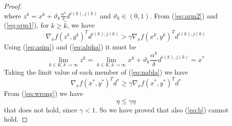 \begin{proof}
\begin{equation}
\end{equation}
where $z^k = x^k + \vartheta_k \frac{\alpha^k}{\delta} d^{i(k),j(k)}$ and $\vartheta_k \in (0,1)$. From (\ref{eq:arm2}) and (\ref{eq:arm1}), for $k \geq \hat{k}$, we have
\begin{equation}\label{eq:nabla}
\nabla_x f(z^k, y^k)^T d^{i(k),j(k)}  > \gamma \nabla_x f(x^k , y^k)^T d^{i(k),j(k)}
\end{equation}
Using (\ref{eq:asim}) and (\ref{eq:alpha}) it must be
\begin{equation}
\lim_{k \in K, k \rightarrow \infty} z^k = \lim_{k \in K, k \rightarrow \infty} x^k + \vartheta_k \frac{\alpha^k}{\delta} d^{i(k),j(k)} = x^*
\end{equation}
Taking the limit value of each member of (\ref{eq:nabla}) we have
\begin{equation}
\nabla_x f(x^*, y^*)^T d^* \geq \gamma \nabla_x f(x^*, y^*)^T d^*
\end{equation}
From (\ref{eq:wrong}) we have
\begin{equation}
\eta \leq \gamma \eta
\end{equation}
that does not hold, since $\gamma < 1$. So we have proved that also (\ref{eq:b}) cannot hold.
\end{proof}